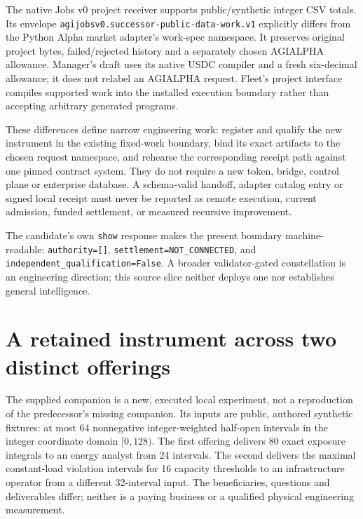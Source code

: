 \documentclass[11pt,letterpaper]{article}
\begin{document}
The native Jobs v0 project receiver supports public/synthetic integer CSV totals. Its envelope
\texttt{agijobsv0.\allowbreak{}successor-\allowbreak{}public-\allowbreak{}data-\allowbreak{}work.\allowbreak{}v1} explicitly differs from the Python Alpha market adapter's work-spec namespace. It preserves original project bytes, failed/rejected history and a separately chosen AGIALPHA allowance. Manager's draft uses its native USDC compiler and a fresh six-decimal allowance; it does not relabel an AGIALPHA request. Fleet's project interface compiles supported work into the installed execution boundary rather than accepting arbitrary generated programs.

These differences define narrow engineering work: register and qualify the new instrument in the existing fixed-work boundary, bind its exact artifacts to the chosen request namespace, and rehearse the corresponding receipt path against one pinned contract system. They do not require a new token, bridge, control plane or enterprise database. A schema-valid handoff, adapter catalog entry or signed local receipt must never be reported as remote execution, current admission, funded settlement, or measured recursive improvement.

The candidate's own \texttt{show} response makes the present boundary machine-readable:
\texttt{authority=[\allowbreak{}]}, \texttt{settlement=NOT\_\allowbreak{}CONNECTED}, and
\texttt{independent\_\allowbreak{}qualification=False}. A broader validator-gated constellation is an engineering direction; this source slice neither deploys one nor establishes general intelligence.


\FloatBarrier
\section{A retained instrument across two distinct offerings}
\label{sec:companion}
The supplied companion is a new, executed local experiment, not a reproduction of the predecessor's missing companion. Its inputs are public, authored synthetic fixtures: at most 64 nonnegative integer-weighted half-open intervals in the integer coordinate domain $[0,128)$. The first offering delivers 80 exact exposure integrals to an energy analyst from 24 intervals. The second delivers the maximal constant-load violation intervals for 16 capacity thresholds to an infrastructure operator from a different 32-interval input. The beneficiaries, questions and deliverables differ; neither is a paying business or a qualified physical engineering measurement.
\end{document}
